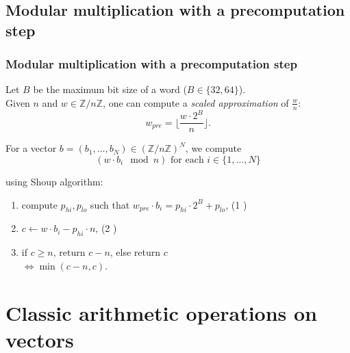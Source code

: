 \documentclass[10pt]{beamer}
\begin{document}
\subsection{Modular multiplication with a precomputation step}
\begin{frame}
    \frametitle{Modular multiplication with a precomputation step}

    \begin{mybox}
        Let $B$ be the maximum bit size of a word ($B\in \{32, 64\}$). \\
        Given $n$ and $w \in \mathbb{Z}/n\mathbb{Z}$, one can compute a \textit{scaled approximation} 
        of $\frac{w}{n}$: $$ w_{pre} = \biggl\lfloor\dfrac{w\cdot 2^{B}}{n} \biggr\rfloor.$$
    \end{mybox}

    \bigskip
    For a vector $b = (b_1,\dots, b_N) \in (\mathbb{Z}/n\mathbb{Z})^N$, we compute 
    $$(w\cdot b_i \mod n) \text{ for each } i\in \{1, \dots, N\}$$

    using Shoup algorithm\cite{Bos_Stam_2021}:
    \medskip
    \begin{enumerate}
        \item compute $p_{hi}, p_{lo}$ such that $w_{pre} \cdot b_i = p_{hi}\cdot 2^B + p_{lo}$, \hfill (1 )
        \item $c \gets w\cdot b_i - p_{hi}\cdot n$, \hfill (2 )
        \item if $c \geq n$, return $c-n$, else return $c$ \\
            $\Longleftrightarrow \min(c-n, c)$.
    \end{enumerate}
\end{frame}

\section{Classic arithmetic operations on vectors}
\end{document}
